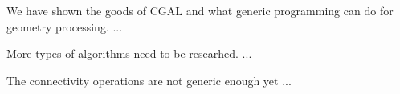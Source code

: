 We have shown the goods of CGAL and what generic programming
can do for geometry processing. ...

More types of algorithms need to be researhed. ...

The connectivity operations are not generic enough yet ...

